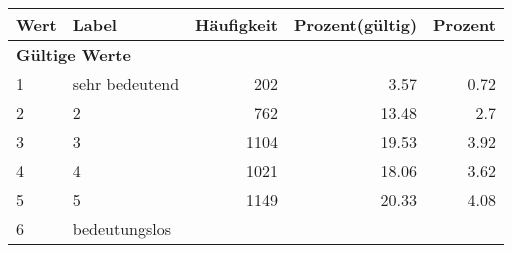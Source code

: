      \begin{longtable}{lXrrr}
     \toprule
     \textbf{Wert} & \textbf{Label} & \textbf{Häufigkeit} & \textbf{Prozent(gültig)} & \textbf{Prozent} \\
     \endhead
     \midrule
     \multicolumn{5}{l}{\textbf{Gültige Werte}}\\

     1 &
     \multicolumn{1}{X}{ sehr bedeutend   } &


       \num{202} &
       \num[round-mode=places,round-precision=2]{3,57} &
         \num[round-mode=places,round-precision=2]{0,72} \\

     2 &
     \multicolumn{1}{X}{ 2   } &


       \num{762} &
       \num[round-mode=places,round-precision=2]{13,48} &
         \num[round-mode=places,round-precision=2]{2,7} \\

     3 &
     \multicolumn{1}{X}{ 3   } &


       \num{1104} &
       \num[round-mode=places,round-precision=2]{19,53} &
         \num[round-mode=places,round-precision=2]{3,92} \\

     4 &
     \multicolumn{1}{X}{ 4   } &


       \num{1021} &
       \num[round-mode=places,round-precision=2]{18,06} &
         \num[round-mode=places,round-precision=2]{3,62} \\

     5 &
     \multicolumn{1}{X}{ 5   } &


       \num{1149} &
       \num[round-mode=places,round-precision=2]{20,33} &
         \num[round-mode=places,round-precision=2]{4,08} \\

     6 &
     \multicolumn{1}{X}{ bedeutungslos   } &



\end{longtable}
